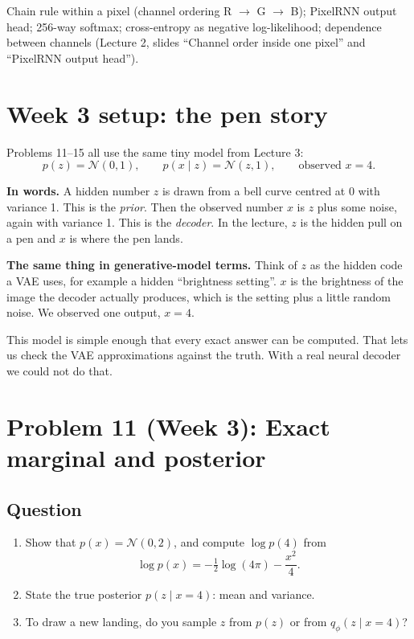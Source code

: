 \documentclass[12pt,a4paper]{article}
\begin{document}
Chain rule within a pixel (channel ordering R $\to$ G $\to$ B); PixelRNN output head; 256-way softmax; cross-entropy as negative log-likelihood; dependence between channels (Lecture 2, slides ``Channel order inside one pixel'' and ``PixelRNN output head'').

\newpage

\section{Week 3 setup: the pen story}

Problems 11--15 all use the same tiny model from Lecture 3:
\[
p(z) = \mathcal{N}(0, 1), \qquad p(x \mid z) = \mathcal{N}(z, 1), \qquad \text{observed } x = 4.
\]

\textbf{In words.} A hidden number $z$ is drawn from a bell curve centred at 0 with variance 1. This is the \emph{prior}. Then the observed number $x$ is $z$ plus some noise, again with variance 1. This is the \emph{decoder}. In the lecture, $z$ is the hidden pull on a pen and $x$ is where the pen lands.

\textbf{The same thing in generative-model terms.} Think of $z$ as the hidden code a VAE uses, for example a hidden ``brightness setting''. $x$ is the brightness of the image the decoder actually produces, which is the setting plus a little random noise. We observed one output, $x = 4$.

This model is simple enough that every exact answer can be computed. That lets us check the VAE approximations against the truth. With a real neural decoder we could not do that.

\section{Problem 11 (Week 3): Exact marginal and posterior}

\subsection{Question}

\begin{enumerate}[leftmargin=*]
\item Show that $p(x) = \mathcal{N}(0, 2)$, and compute $\log p(4)$ from
\[
\log p(x) = -\tfrac{1}{2}\log(4\pi) - \frac{x^2}{4}.
\]
\item State the true posterior $p(z \mid x = 4)$: mean and variance.
\item To draw a new landing, do you sample $z$ from $p(z)$ or from $q_\phi(z \mid x = 4)$?
\end{enumerate}
\end{document}
